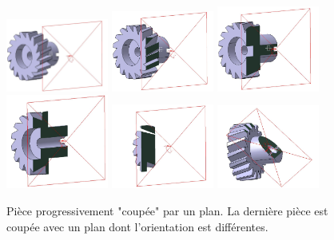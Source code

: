 \documentclass[
	11pt, %
	fleqn, %
	a4paper, %
]{LegrandOrangeBook}
\begin{document}
\begin{figure}[H] %
	\centering %
	\includegraphics[width=0.3\textwidth]{Images/Coupe1.JPG} %
    \includegraphics[width=0.3\textwidth]{Images/Coupe2.JPG} %
    \includegraphics[width=0.3\textwidth]{Images/Coupe3.JPG} %
    \includegraphics[width=0.3\textwidth]{Images/Coupe4.JPG} %
    \includegraphics[width=0.3\textwidth]{Images/Coupe5.JPG} %
    \includegraphics[width=0.3\textwidth]{Images/Coupe6.JPG} %
	\caption{Pièce progressivement "coupée" par un plan. La dernière pièce est coupée avec un plan dont l'orientation est différentes.}
	\label{Coupe} %
\end{figure}
\end{document}
